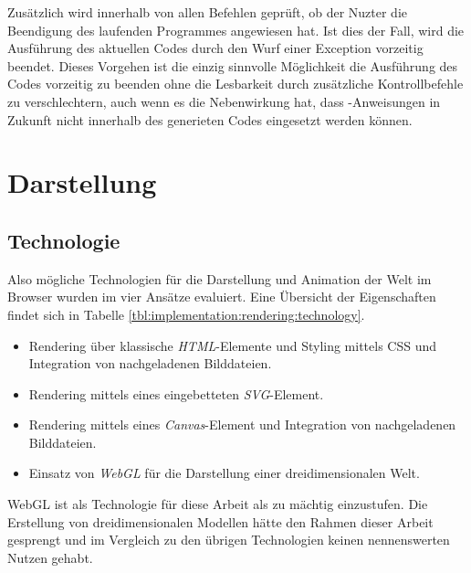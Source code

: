 
Zusätzlich wird innerhalb von allen Befehlen geprüft, ob der Nuzter die Beendigung des laufenden Programmes angewiesen hat. Ist dies der Fall, wird die Ausführung des aktuellen Codes durch den Wurf einer Exception vorzeitig beendet. Dieses Vorgehen ist die einzig sinnvolle Möglichkeit die Ausführung des Codes vorzeitig zu beenden ohne die Lesbarkeit durch zusätzliche Kontrollbefehle zu verschlechtern, auch wenn es die Nebenwirkung hat, dass -Anweisungen in Zukunft nicht innerhalb des generieten Codes eingesetzt werden können.

\section{Darstellung}
\label{sec:implementation:rendering}

\TODO{}

\subsection{Technologie}
\label{sec:implementation:rendering:technology}

Also mögliche Technologien für die Darstellung und Animation der Welt im Browser wurden im vier Ansätze evaluiert. Eine Übersicht der Eigenschaften findet sich in Tabelle \ref{tbl:implementation:rendering:technology}.

\begin{itemize}
  \item Rendering über klassische \emph{HTML}-Elemente und Styling mittels CSS und Integration von nachgeladenen Bilddateien.
  \item Rendering mittels eines eingebetteten \emph{SVG}-Element.
  \item Rendering mittels eines \emph{Canvas}-Element und Integration von nachgeladenen Bilddateien.
  \item Einsatz von \emph{WebGL} für die Darstellung einer dreidimensionalen Welt.
\end{itemize}

WebGL ist als Technologie für diese Arbeit als zu mächtig einzustufen. Die Erstellung von dreidimensionalen Modellen hätte den Rahmen dieser Arbeit gesprengt und im Vergleich zu den übrigen Technologien keinen nennenswerten Nutzen gehabt.

